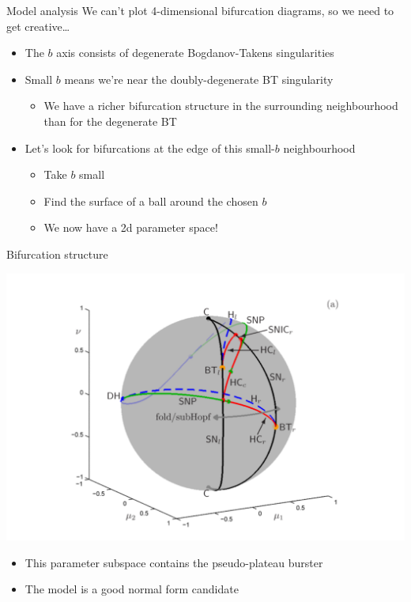 \documentclass[presentation]{beamer}
\begin{document}
\begin{frame}[label={sec:orgb78f091}]{Model analysis}
We can't plot 4-dimensional bifurcation diagrams, so we need to get creative\ldots{}

\begin{itemize}[<+->]
\item The \(b\) axis consists of degenerate Bogdanov-Takens singularities
\item Small \(b\) means we're near the doubly-degenerate BT singularity
\begin{itemize}
\item We have a richer bifurcation structure in the surrounding neighbourhood than for the degenerate BT
\end{itemize}
\item Let's look for bifurcations at the edge of this small-\(b\) neighbourhood
\begin{itemize}
\item Take \(b\) small
\item Find the surface of a ball around the chosen \(b\)
\item We now have a 2d parameter space!
\end{itemize}
\end{itemize}
\end{frame}

\begin{frame}[plain,label={sec:org1802604}]{Bifurcation structure}
\begin{center}
\includegraphics[width=.9\textwidth]{./bif.png}
\end{center}

\begin{itemize}
\item This parameter subspace contains the pseudo-plateau burster
\item The model is a good normal form candidate
\end{itemize}
\end{frame}
\end{document}
